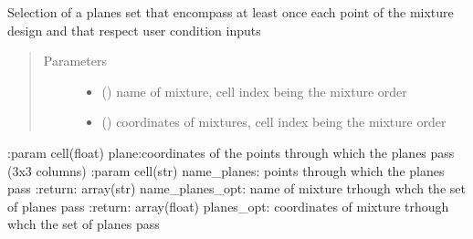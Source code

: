\documentclass[letterpaper,10pt,english]{sphinxmanual}
\begin{document}
\label{\detokenize{ExperimentsPlannification:module-modules}}

\begin{fulllineitems}
\label{\detokenize{ExperimentsPlannification:modules.planes_set}}
\sphinxAtStartPar
Selection of a planes set that encompass at least once  each point of the mixture design and that respect user condition inputs
\begin{quote}\begin{description}
\item[{Parameters}] \leavevmode\begin{itemize}
\item {} 
\sphinxAtStartPar
{} () \textendash{} name of mixture, cell index being the mixture order

\item {} 
\sphinxAtStartPar
{} () \textendash{} coordinates of mixtures, cell index being the mixture order 

\end{itemize}

\end{description}\end{quote}

\sphinxAtStartPar
:param cell(float) plane:coordinates of the points through which the planes pass (3x3 columns)
:param cell(str) name\_planes: points through which the planes pass
:return: array(str) name\_planes\_opt: name of mixture trhough whch the set of planes pass
:return: array(float) planes\_opt: coordinates of mixture trhough whch the set of planes pass

\end{fulllineitems}

\label{\detokenize{ExperimentsPlannification:module-modules}}
\end{document}
